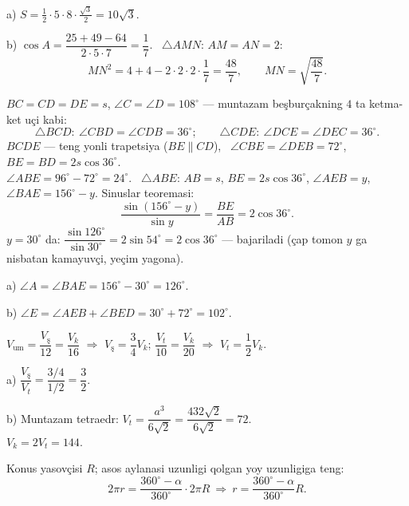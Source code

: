 a) $S=\frac12\cdot5\cdot8\cdot\frac{\sqrt3}2=10\sqrt3$.

b) $\cos A=\dfrac{25+49-64}{2\cdot5\cdot7}=\dfrac17$. \ $\triangle AMN$: $AM=AN=2$:
\[MN^2=4+4-2\cdot2\cdot2\cdot\frac17=\frac{48}7,\qquad MN=\sqrt{\frac{48}7}.\]

\newpage
{}
$BC=CD=DE=s$, $\angle C=\angle D=108^\circ$ — muntazam beşburçakning $4$ ta ketma-ket uçi kabi:
\[\triangle BCD:\ \angle CBD=\angle CDB=36^\circ;\qquad \triangle CDE:\ \angle DCE=\angle DEC=36^\circ.\]
$BCDE$ — teng yonli trapetsiya ($BE\parallel CD$), \ $\angle CBE=\angle DEB=72^\circ$, \ $BE=BD=2s\cos36^\circ$.\\
$\angle ABE=96^\circ-72^\circ=24^\circ$. \ $\triangle ABE$: $AB=s$, $BE=2s\cos36^\circ$, $\angle AEB=y$, $\angle BAE=156^\circ-y$. Sinuslar teoremasi:
\[\frac{\sin(156^\circ-y)}{\sin y}=\frac{BE}{AB}=2\cos36^\circ.\]
$y=30^\circ$ da: $\dfrac{\sin126^\circ}{\sin30^\circ}=2\sin54^\circ=2\cos36^\circ$ — bajariladi (çap tomon $y$ ga nisbatan kamayuvçi, yeçim yagona).

a) $\angle A=\angle BAE=156^\circ-30^\circ=126^\circ$.

b) $\angle E=\angle AEB+\angle BED=30^\circ+72^\circ=102^\circ$.

\newpage
{}
$V_{\text{um}}=\dfrac{V_{\text{ş}}}{12}=\dfrac{V_k}{16}$ $\Rightarrow$ $V_{\text{ş}}=\dfrac34V_k$; \qquad $\dfrac{V_t}{10}=\dfrac{V_k}{20}$ $\Rightarrow$ $V_t=\dfrac12V_k$.

a) $\dfrac{V_{\text{ş}}}{V_t}=\dfrac{3/4}{1/2}=\dfrac32$.

b) Muntazam tetraedr: $V_t=\dfrac{a^3}{6\sqrt2}=\dfrac{432\sqrt2}{6\sqrt2}=72$.\\
$V_k=2V_t=144$.

\newpage
{}
Konus yasovçisi $R$; asos aylanasi uzunligi qolgan yoy uzunligiga teng:
\[2\pi r=\frac{360^\circ-\alpha}{360^\circ}\cdot2\pi R\ \Rightarrow\ r=\frac{360^\circ-\alpha}{360^\circ}R.\]

